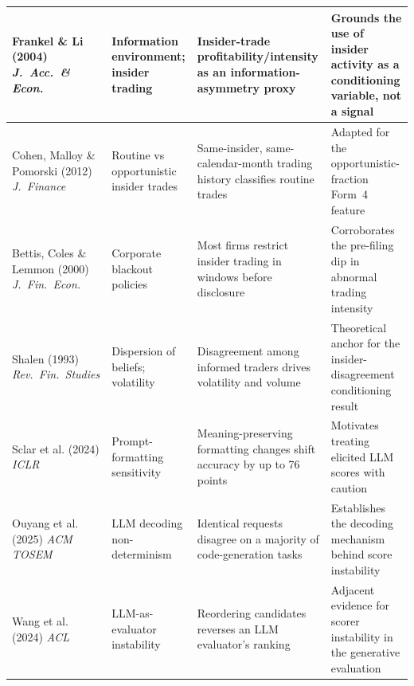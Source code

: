 \documentclass[logo,msc,ai]{infthesis}        %
\begin{document}
{\begin{longtable}{@{}L{2.4cm}L{2.6cm}L{3.7cm}L{3.7cm}@{}}
Frankel \& Li (2004) \cite{frankel2004characteristics}\newline \textit{J.\ Acc.\ \& Econ.} &
Information environment; insider trading &
Insider-trade profitability/intensity as an information-asymmetry proxy &
Grounds the use of insider activity as a conditioning variable, not a signal \\
\hline

Cohen, Malloy \& Pomorski (2012) \cite{cohen2012decoding}\newline \textit{J.\ Finance} &
Routine vs opportunistic insider trades &
Same-insider, same-calendar-month trading history classifies routine trades &
Adapted for the opportunistic-fraction Form~4 feature \\
\hline

Bettis, Coles \& Lemmon (2000) \cite{bettis2000corporate}\newline \textit{J.\ Fin.\ Econ.} &
Corporate blackout policies &
Most firms restrict insider trading in windows before disclosure &
Corroborates the pre-filing dip in abnormal trading intensity \\
\hline

Shalen (1993) \cite{shalen1993volume}\newline \textit{Rev.\ Fin.\ Studies} &
Dispersion of beliefs; volatility &
Disagreement among informed traders drives volatility and volume &
Theoretical anchor for the insider-disagreement conditioning result \\
\hline

Sclar et al. (2024) \cite{sclar2024quantifying}\newline \textit{ICLR} &
Prompt-formatting sensitivity &
Meaning-preserving formatting changes shift accuracy by up to 76 points &
Motivates treating elicited LLM scores with caution \\
\hline

Ouyang et al. (2025) \cite{ouyang2025empirical}\newline \textit{ACM TOSEM} &
LLM decoding non-determinism &
Identical requests disagree on a majority of code-generation tasks &
Establishes the decoding mechanism behind score instability \\
\hline

Wang et al. (2024) \cite{wang2024large}\newline \textit{ACL} &
LLM-as-evaluator instability &
Reordering candidates reverses an LLM evaluator's ranking &
Adjacent evidence for scorer instability in the generative evaluation \\

\end{longtable}
}
\end{document}
